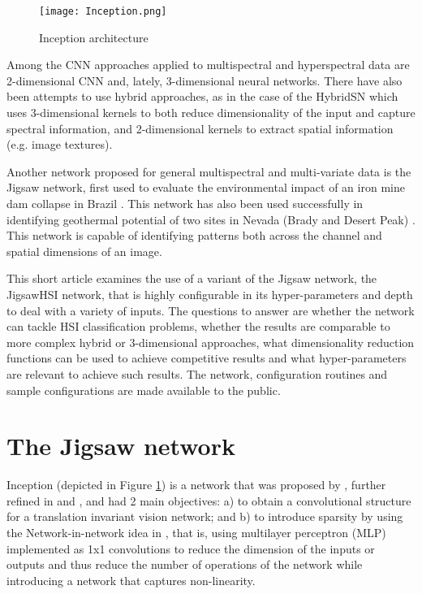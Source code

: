 \documentclass[lettersize, journal]{IEEEtran}
\begin{document}
\begin{figure}[htb]
    \centering
    \texttt{[image: Inception.png]}
    \caption{Inception architecture}
    \label{fig:Inception}
\end{figure}

Among the CNN approaches applied to multispectral and hyperspectral data are 2-dimensional CNN and, lately, 3-dimensional neural networks. There have also been attempts to use hybrid approaches, as in the case of the HybridSN \cite{roy_hybridsn_2020} which uses 3-dimensional kernels to both reduce dimensionality of the input and capture spectral information, and 2-dimensional kernels to extract spatial information (e.g. image textures).


Another network proposed for general multispectral and multi-variate data is the Jigsaw network, first used to evaluate the environmental impact of an iron mine dam collapse in Brazil \cite{moraga_monitoring_2020}. This network has also been used successfully in identifying geothermal potential of two sites in Nevada (Brady and Desert Peak) \cite{moraga_geothermal_2022}. This network is capable of identifying patterns both across the channel and spatial dimensions of an image.

This short article examines the use of a variant of the Jigsaw network, the JigsawHSI network, that is highly configurable in its hyper-parameters and depth to deal with a variety of inputs. The questions to answer are whether the network can tackle HSI classification problems, whether the results are comparable to more complex hybrid or 3-dimensional approaches, what dimensionality reduction functions can be used to achieve competitive results and what hyper-parameters are relevant to achieve such results. The network, configuration routines and sample configurations are made available to the public. 

\section{The Jigsaw network}
Inception (depicted in Figure \ref{fig:Inception}) is a network that was proposed by \cite{szegedy_going_2015}, further refined in \cite{szegedy_rethinking_2016} and \cite{szegedy_inception-v4_2017}, and had 2 main objectives: a) to obtain a convolutional structure for a translation invariant vision network; and b) to introduce sparsity by using the Network-in-network idea in \cite{lin_network_2014}, that is, using multilayer perceptron (MLP) implemented as 1x1 convolutions to reduce the dimension of the inputs or outputs and thus reduce the number of operations of the network while introducing a network that captures non-linearity. 
\end{document}
